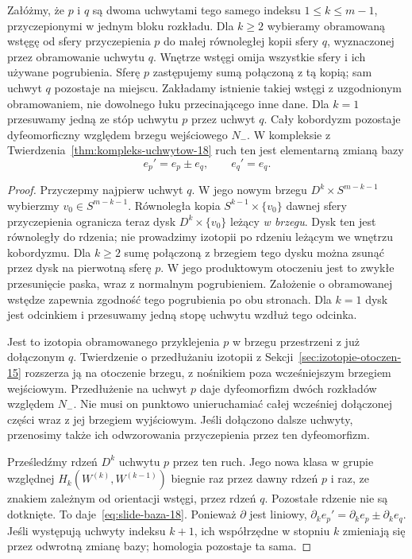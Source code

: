 \begin{stwierdzenie}
\label{prop:slide-18}
Załóżmy, że $p$ i $q$ są dwoma uchwytami
tego samego indeksu $1\leq k\leq m-1$,
przyczepionymi w jednym bloku rozkładu.
Dla $k\geq2$ wybieramy obramowaną wstęgę od sfery
przyczepienia $p$ do małej równoległej kopii sfery $q$,
wyznaczonej przez obramowanie uchwytu $q$.
Wnętrze wstęgi omija wszystkie sfery i ich używane
pogrubienia. Sferę $p$ zastępujemy sumą połączoną
z tą kopią; sam uchwyt $q$ pozostaje na miejscu.
Zakładamy istnienie takiej wstęgi z uzgodnionym
obramowaniem, nie dowolnego łuku przecinającego inne dane.
Dla $k=1$ przesuwamy jedną ze stóp
uchwytu $p$ przez uchwyt $q$.
Cały kobordyzm pozostaje dyfeomorficzny
względem brzegu wejściowego $N_-$.
W kompleksie z
Twierdzenia~\ref{thm:kompleks-uchwytow-18}
ruch ten jest elementarną zmianą bazy
\begin{equation}\label{eq:slide-baza-18}
 e_p'=e_p\pm e_q,\qquad e_q'=e_q.
\end{equation}
\end{stwierdzenie}
\begin{proof}
Przyczepmy najpierw uchwyt $q$.
W jego nowym brzegu $D^k\times S^{m-k-1}$
wybierzmy $v_0\in S^{m-k-1}$.
Równoległa kopia $S^{k-1}\times\{v_0\}$ dawnej
sfery przyczepienia ogranicza teraz dysk
$D^k\times\{v_0\}$ leżący \emph{w brzegu}.
Dysk ten jest równoległy do rdzenia; nie prowadzimy
izotopii po rdzeniu leżącym we wnętrzu kobordyzmu.
Dla $k\geq2$ sumę połączoną z brzegiem tego dysku
można zsunąć przez dysk na pierwotną sferę $p$.
W jego produktowym otoczeniu jest to zwykłe
przesunięcie paska, wraz z normalnym pogrubieniem.
Założenie o obramowanej wstędze zapewnia zgodność
tego pogrubienia po obu stronach.
Dla $k=1$ dysk jest odcinkiem i przesuwamy
jedną stopę uchwytu wzdłuż tego odcinka.

Jest to izotopia obramowanego przyklejenia $p$
w brzegu przestrzeni z już dołączonym $q$.
Twierdzenie o przedłużaniu izotopii z
Sekcji~\ref{sec:izotopie-otoczen-15} rozszerza ją
na otoczenie brzegu, z nośnikiem poza wcześniejszym
brzegiem wejściowym. Przedłużenie na uchwyt $p$
daje dyfeomorfizm dwóch rozkładów względem $N_-$.
Nie musi on punktowo unieruchamiać całej wcześniej
dołączonej części wraz z jej brzegiem wyjściowym.
Jeśli dołączono dalsze uchwyty, przenosimy także
ich odwzorowania przyczepienia przez ten dyfeomorfizm.

Prześledźmy rdzeń $D^k$ uchwytu $p$
przez ten ruch. Jego nowa klasa
w grupie względnej
$H_k(W^{(k)},W^{(k-1)})$
biegnie raz przez dawny rdzeń $p$
i raz, ze znakiem zależnym od
orientacji wstęgi, przez rdzeń $q$.
Pozostałe rdzenie nie są dotknięte.
To daje~\eqref{eq:slide-baza-18}.
Ponieważ $\partial$ jest liniowy,
$\partial_k e_p'
 =\partial_k e_p\pm\partial_k e_q$.
Jeśli występują uchwyty indeksu $k+1$,
ich współrzędne w stopniu $k$ zmieniają
się przez odwrotną zmianę bazy;
homologia pozostaje ta sama.
\end{proof}

